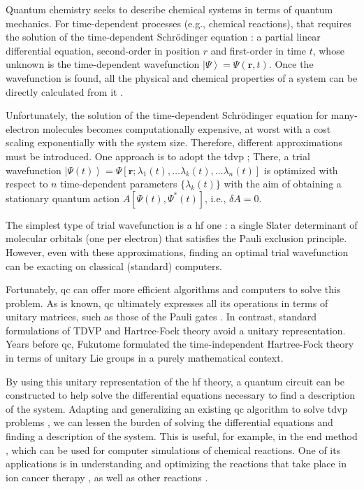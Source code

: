 \documentclass{aux/ttuthes2007}
\newcommand{\ket}[1]{\ensuremath{\left|#1\right\rangle}}
\begin{document}
Quantum chemistry  seeks to describe chemical systems in terms of quantum mechanics.
For time-dependent processes (e.g., chemical reactions), that requires the solution of the time-dependent Schrödinger equation : a partial linear differential equation, second-order in position $r$ and first-order in time $t$, whose unknown is the time-dependent wavefunction $\ket \Psi = \Psi(\bm r, t)$.
Once the wavefunction is found, all the physical and chemical properties of a system can be directly calculated from it .

Unfortunately, the solution of the time-dependent Schrödinger equation for many-electron molecules becomes computationally expensive, at worst with a cost scaling exponentially with the system size.
Therefore, different approximations must be introduced.
One approach is to adopt the \gls{tdvp} ;
There, a trial wavefunction $\ket {\Psi(t)} = \Psi\left[\bm r; \lambda_1(t), \ldots \lambda_k(t), \ldots \lambda_n(t) \right ]$ is optimized with respect to $n$ time-dependent parameters $\{\lambda_k(t)\}$ with the aim of obtaining a stationary quantum action $A \left[ \Psi(t), \Psi^*(t) \right ] $, i.e., $\delta A = 0$.

The simplest type of trial wavefunction is a \gls{hf} one :
a single Slater determinant of molecular orbitals (one per electron) that satisfies the Pauli exclusion principle.
However, even with these approximations, finding an optimal trial wavefunction can be exacting on classical (standard) computers.

Fortunately, \gls{qc}  can offer more efficient algorithms and computers to solve this problem.
As is known, \gls{qc} ultimately expresses all its operations in terms of unitary matrices, such as those of the Pauli gates .
In contrast, standard formulations of TDVP and Hartree-Fock theory  avoid a unitary representation.
Years before \gls{qc}, Fukutome  formulated the time-independent Hartree-Fock theory in terms of unitary Lie groups  in a purely mathematical context.

By using this unitary representation of the \gls{hf} theory, a quantum circuit can be constructed to help solve the differential equations necessary to find a description of the system. 
Adapting and generalizing an existing \gls{qc} algorithm to solve \gls{tdvp} problems , we can lessen the burden of solving the differential equations and finding a description of the system.
This is useful, for example, in the \gls{end} method , which can be used for computer simulations of chemical reactions.
One of its applications is in understanding and optimizing the reactions that take place in ion cancer therapy , as well as other reactions .
\end{document}
